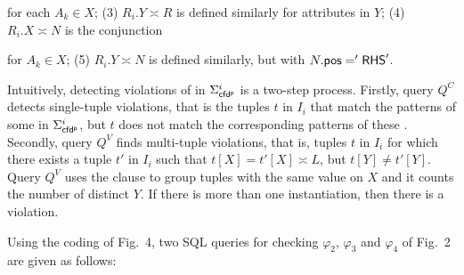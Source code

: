 {\noindent for each $A_{k} \in X$; (3) $R_i.Y\asymp R$ is defined similarly for attributes in $Y$; (4) $R_i.X\asymp N$ is the conjunction

\begin{footnotesize}
\end{footnotesize}

\noindent for $A_{k} \in X$; (5) $R_i.Y\asymp N$ is defined similarly, but with $N.\protect\mathsf{pos}='{\mathsf{RHS}}'$.

Intuitively, detecting violations of \pCFDs in $\Sigma_{{\mathsf{cfd^p}}}^i$ is a two-step process. Firstly, query $Q^{C}$ detects single-tuple violations, that is the tuples $t$ in $I_{i}$ that match the \LHS patterns of some \pCFDs in $\Sigma_{{\mathsf{cfd^p}}}^i$, but $t$ does not match the corresponding \RHS patterns of these \pCFDs. Secondly, query $Q^{V}$ finds multi-tuple violations, that is, tuples $t$ in $I_{i}$ for which there exists a tuple $t'$ in $I_{i}$ such that $t[X]=t'[X] \asymp L$, but $t[Y] \neq t'[Y]$. Query $Q^{V}$ uses the  clause to group tuples with the same value on $X$ and it counts the number of distinct $Y$. If there is more than one instantiation, then there is a violation.

\begin{example}\label{exa-cfd-query} Using the coding of Fig.~4, two SQL queries for checking \pCFDs $\varphi_2$, $\varphi_3$ and $\varphi_4$ of Fig.~2 are given as follows:

\begin{footnotesize}
\end{footnotesize}
\end{example}}
